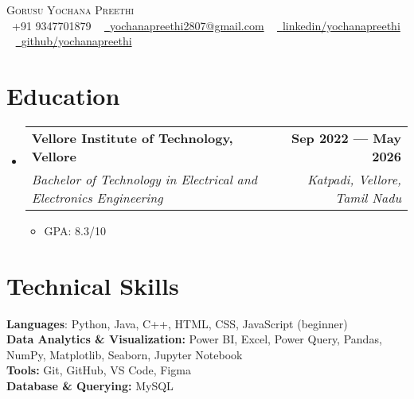\documentclass[letterpaper,11pt]{article}
\makeatletter
\newcommand{\resumeItem}[1]{
  \item\small{
    {#1 \vspace{-2pt}}
  }
}
\newcommand{\resumeSubheading}[4]{
  \vspace{-2pt}\item
    \begin{tabular*}{1.0\textwidth}[t]{l@{\extracolsep{\fill}}r}
      \textbf{#1} & \textbf{\small #2} \\
      \textit{\small#3} & \textit{\small #4} \\
    \end{tabular*}\vspace{-7pt}
}
\newcommand{\resumeSubHeadingListStart}{\begin{itemize}[leftmargin=0.0in, label={}]}
\newcommand{\resumeSubHeadingListEnd}{\end{itemize}}
\newcommand{\resumeItemListStart}{\begin{itemize}}
\newcommand{\resumeItemListEnd}{\end{itemize}\vspace{-5pt}}
\makeatother
\begin{document}

\begin{center}
    {\Huge \scshape Gorusu Yochana Preethi} \\ \vspace{4pt}
    \small \raisebox{-0.1\height}\faPhone\ +91 9347701879 ~ \href{mailto:yochanapreethi2807@gmail.com}{\raisebox{-0.2\height}\faEnvelope\  {yochanapreethi2807@gmail.com}} ~ 
    \href{https://www.linkedin.com/in/yochanapreethi//}{\raisebox{-0.2\height}\faLinkedin\ {\href{}{linkedin/yochanapreethi}}}  ~
    \href{https://github.com/yochanapreethi}{\raisebox{-0.2\height}\faGithub\ {github/yochanapreethi}}
    \vspace{3pt}
    \newline
    \href{https://leetcode.com/u/yochanapreethi/}{\raisebox{-0.2\height}{Leetcode}} ~
    \href{https://www.codechef.com/users/yochanapreethi}{\raisebox{-0.2\height}{Codechef}} ~
    \href{https://www.geeksforgeeks.org/user/yochanapreethi/}{\raisebox{-0.2\height}{GeeksforGeeks}} ~
    \href{https://www.hackerrank.com/yochanapreethi}{\raisebox{-0.2\height}{HackerRank}}
    \vspace{-2pt}
\end{center}

\section{Education}
  \resumeSubHeadingListStart
    \resumeSubheading
      {Vellore Institute of Technology, Vellore}{Sep 2022 — May 2026}
      {Bachelor of Technology in Electrical and Electronics Engineering}{Katpadi, Vellore, Tamil Nadu}
      \vspace{-2mm}
      \resumeItemListStart
        \resumeItem{GPA: 8.3/10}
      \resumeItemListEnd
  \resumeSubHeadingListEnd

\section{Technical Skills}
 \begin{itemize}[leftmargin=0.15in, label={}]
    \small{\item{
     \textbf{Languages}{: Python, Java, C++, HTML, CSS, JavaScript (beginner)} \\
     \textbf{Data Analytics \& Visualization:} Power BI, Excel, Power Query, Pandas, NumPy, Matplotlib, Seaborn, Jupyter Notebook \\
    \textbf{Tools:} Git, GitHub, VS Code, Figma \\
    \textbf{Database \& Querying:} MySQL}}
 \end{itemize}
 \vspace{-16pt}
\end{document}
